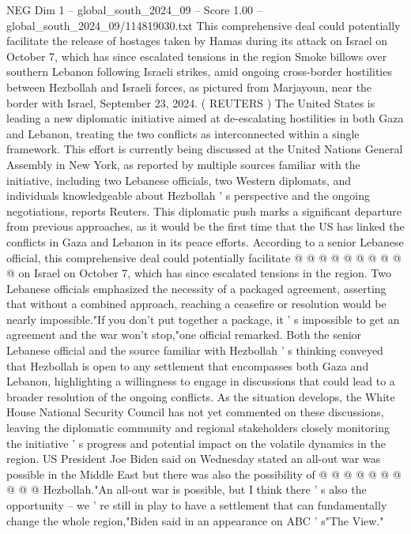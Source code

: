 \begin{textsample}{NEG Dim 1 – global\_south\_2024\_09 – Score 1.00 – global\_south\_2024\_09/114819030.txt}  \label{ex:f1_neg_239}
This comprehensive deal could potentially facilitate the release of hostages taken by Hamas during its attack on Israel on October 7, which has since escalated tensions in the region Smoke billows over southern Lebanon following Israeli strikes, amid ongoing cross-border hostilities between Hezbollah and Israeli forces, as pictured from Marjayoun, near the border with Israel, September 23, 2024. ( REUTERS ) The United States is leading a new diplomatic initiative aimed at de-escalating hostilities in both Gaza and Lebanon, treating the two conflicts as interconnected within a single framework.
This effort is currently being discussed at the United Nations General Assembly in New York, as reported by multiple sources familiar with the initiative, including two Lebanese officials, two Western diplomats, and individuals knowledgeable about Hezbollah ' s perspective and the ongoing negotiations, reports Reuters.
This diplomatic push marks a significant departure from previous approaches, as it would be the first time that the US has linked the conflicts in Gaza and Lebanon in its peace efforts.
According to a senior Lebanese official, this comprehensive deal could potentially facilitate @ @ @ @ @ @ @ @ @ @ on Israel on October 7, which has since escalated tensions in the region.
Two Lebanese officials emphasized the necessity of a packaged agreement, asserting that without a combined approach, reaching a ceasefire or resolution would be nearly impossible."If you don't put together a package, it ' s impossible to get an agreement and the war won't stop,"one official remarked.
Both the senior Lebanese official and the source familiar with Hezbollah ' s thinking conveyed that Hezbollah is open to any settlement that encompasses both Gaza and Lebanon, highlighting a willingness to engage in discussions that could lead to a broader resolution of the ongoing conflicts.
As the situation develops, the White House National Security Council has not yet commented on these discussions, leaving the diplomatic community and regional stakeholders closely monitoring the initiative ' s progress and potential impact on the volatile dynamics in the region.
US President Joe Biden said on Wednesday stated an all-out war was possible in the Middle East but there was also the possibility of @ @ @ @ @ @ @ @ @ @ Hezbollah."An all-out war is possible, but I think there ' s also the opportunity -- we ' re still in play to have a settlement that can fundamentally change the whole region,"Biden said in an appearance on ABC ' s"The View."

\end{textsample}
